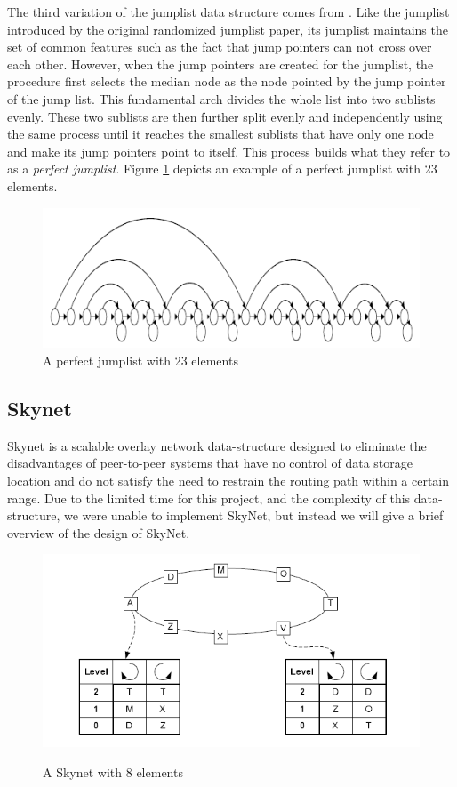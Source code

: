 \documentclass[oribibl]{llncs}
\begin{document}
The third variation of the jumplist data structure comes from \cite{ElmasryMarch2005}. Like the jumplist introduced by the original randomized jumplist paper, its jumplist maintains the set of common features such as the fact that jump pointers can not cross over each other. However, when the jump pointers are created for the jumplist, the procedure first selects the median node as the node pointed by the jump pointer of the jump list. This fundamental arch divides the whole list into two sublists evenly. These two sublists are then further split evenly and independently using the same process until it reaches the smallest sublists that have only one node and make its jump pointers point to itself. This process builds what they refer to as a {\it perfect jumplist}. Figure \ref{fig:jumplist1} depicts an example of a perfect jumplist with 23 elements.


\begin{figure}[here]
\center
\includegraphics[width=12cm]{images/perfect_jumplist}
\caption{A perfect jumplist with 23 elements}
\label{fig:jumplist1}
\end{figure}

\subsection{Skynet}

Skynet is a scalable overlay network data-structure designed to eliminate the disadvantages of peer-to-peer systems that have no control of data storage location and do not satisfy the need to restrain the routing path within a certain range. Due to the limited time for this project, and the complexity of this data-structure, we were unable to implement SkyNet, but instead we will give a brief overview of the design of SkyNet.

\begin{figure}[here]
\center\underline{}
\includegraphics[width=12cm]{images/skynet}
\caption{A Skynet with 8 elements}
\label{fig:skynet}
\end{figure}
\end{document}
